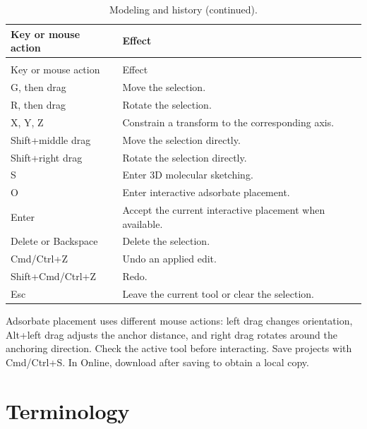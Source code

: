 \begin{longtable}{>{\raggedright\arraybackslash}p{.37\linewidth}>{\raggedright\arraybackslash}p{}}
\caption{Modeling and history.}\\
\toprule
Key or mouse action & Effect \\
\midrule
\endfirsthead
\caption[]{Modeling and history (continued).}\\
\toprule
Key or mouse action & Effect \\
\midrule
\endhead
\bottomrule
\endfoot
\bottomrule
\endlastfoot
G, then drag & Move the selection.\\
R, then drag & Rotate the selection.\\
X, Y, Z & Constrain a transform to the corresponding axis.\\
Shift+middle drag & Move the selection directly.\\
Shift+right drag & Rotate the selection directly.\\
S & Enter 3D molecular sketching.\\
O & Enter interactive adsorbate placement.\\
Enter & Accept the current interactive placement when available.\\
Delete or Backspace & Delete the selection.\\
Cmd/Ctrl+Z & Undo an applied edit.\\
Shift+Cmd/Ctrl+Z & Redo.\\
Esc & Leave the current tool or clear the selection.\\
\end{longtable}

Adsorbate placement uses different mouse actions: left drag changes orientation, Alt+left drag adjusts the anchor distance, and right drag rotates around the anchoring direction. Check the active tool before interacting. Save projects with Cmd/Ctrl+S. In Online, download after saving to obtain a local copy.

\Needspace{145mm}
\section{Terminology}

